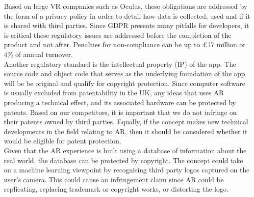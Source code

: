 Based on large VR companies such as Oculus, these obligations are addressed by the form of a privacy policy in order to detail how data is collected, used and if it is shared with third parties. Since GDPR presents many pitfalls for developers, it is critical these regulatory issues are addressed before the completion of the product and not after. Penalties for non-compliance can be up to \pounds 17 million or 4\% of annual turnover. \cite{eversheds}\\

Another regulatory standard is the intellectual property (IP) of the app. The source code and object code that serves as the underlying foundation of the app will be be original and qualify for copyright protection. Since computer software is usually excluded from patentability in the UK, any ideas that uses AR producing a technical effect, and its associated hardware can be protected by patents. Based on our competitors, it is important that we do not infringe on their patents owned by third parties. Equally, if the concept makes new technical developments in the field relating to AR, then it should be considered whether it would be eligible for patent protection.\\

Given that the AR experience is built using a database of information about the real world, the database can be protected by copyright. The concept could take on a machine learning viewpoint by recognising third party logos captured on the user's camera. This could cause an infringement claim since AR could be replicating, replacing trademark or copyright works, or distorting the logo.\\
